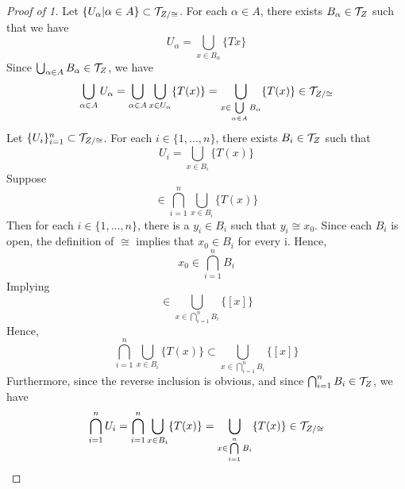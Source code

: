 \begin{prop}
\begin{proof}[Proof of 1]
        Let $\{U_{\alpha} | \alpha \in A\} \subset \mathcal{T}_{Z/\cong}$. 
        For each $\alpha \in A$, there exists $B_{\alpha} \in \mathcal{T}_{Z}$ such that we have
        \begin{equation} 
            U_{\alpha } = \bigcup_{x \in B_{\alpha}} \{Tx\}
        \end{equation} 
        Since $\bigcup_{\alpha \in A} B_\alpha \in \mathcal{T}_{Z}$, we have 
        \begin{equation}
            \bigcup_{\alpha \in A} U_{\alpha}= \bigcup\limits_{\alpha \in A} \bigcup\limits_{x \in U_\alpha} \{T(x)\} = \bigcup\limits_{x \in \bigcup\limits_{\alpha \in A} B_{\alpha}} \{T(x)\} \in \mathcal{T}_{Z/\cong}
        \end{equation} 
        Let $\{U_i\}_{i=1}^n \subset \mathcal{T}_{Z/\cong}$. 
        For each $i \in \{1, ..., n\}$, there exists $B_i \in \mathcal{T}_{Z}$ such that
        \begin{equation}
            U_i = \bigcup_{x \in B_{i}} \{T(x)\}
        \end{equation}
        Suppose 
        \begin{equation}
            [x_0] \in \bigcap\limits_{i=1}^n \bigcup\limits_{x \in B_i} \{T(x)\}
        \end{equation}
        Then for each $i \in \{1,..., n\}$, there is a $y_i \in B_i$ such that $ y_i \cong x_0$. 
        Since each $B_i$ is open, the definition of $\cong$ implies that $x_0 \in B_i$ for every i. Hence, 
        \begin{equation} 
            x_0 \in \bigcap_{i=1}^n B_i
        \end{equation} 
        Implying 
        \begin{equation}
            [x_0] \in  \bigcup\limits_{x \in \bigcap\limits_{i=1}^n B_i} \{[x]\}
        \end{equation} 
        Hence, 
        \begin{equation} 
            \bigcap\limits_{i=1}^n \bigcup\limits_{x \in B_i} \{T(x)\}
            \subset
            \bigcup\limits_{x \in \bigcap\limits_{i=1}^n B_i} \{[x]\}
        \end{equation} 
        Furthermore, since the reverse inclusion is obvious, 
        and since $\bigcap_{i=1}^n B_i \in \mathcal{T}_{Z}$, we have 
        \begin{equation}
            \bigcap_{i=1}^n U_i = \bigcap_{i=1}^n \bigcup_{x \in B_i} \{T(x)\}= \bigcup\limits_{x \in \bigcap\limits_{i=1}^n B_i} \{T(x)\} \in \mathcal{T}_{Z/\cong}
        \end{equation}

\end{proof}
\end{prop}

